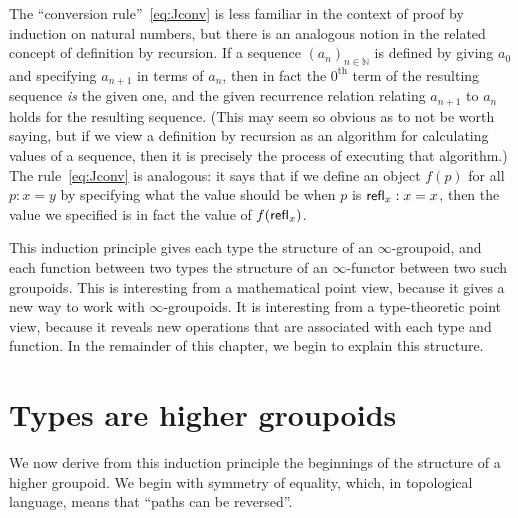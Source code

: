 The ``conversion rule''~\eqref{eq:Jconv} is less familiar in the context of proof by induction on natural numbers, but there is an analogous notion in the related concept of definition by recursion.
If a sequence $(a_n)_{n\in \mathbb{N}}$ is defined by giving $a_0$ and specifying $a_{n+1}$ in terms of $a_n$, then in fact the $0^{\mathrm{th}}$ term of the resulting sequence \emph{is} the given one, and the given recurrence relation relating $a_{n+1}$ to $a_n$ holds for the resulting sequence.
(This may seem so obvious as to not be worth saying, but if we view a definition by recursion as an algorithm for calculating values of a sequence, then it is precisely the process of executing that algorithm.)
The rule~\eqref{eq:Jconv} is analogous: it says that if we define an object $f(p)$ for all $p:x=y$ by specifying what the value should be when $p$ is $\mathsf{refl}_{x}:x=x$, then the value we specified is in fact the value of $f(\mathsf{refl}_{x})$.

This induction principle gives each type the structure of an $\infty$-groupoid, and each function between two types the structure of an $\infty$-functor between two such groupoids.  This is interesting from a mathematical point view, because it gives a new way to work with
$\infty$-groupoids.  It is interesting from a type-theoretic point view, because it reveals new operations that are associated with each type and function.  In the remainder of this chapter, we begin to explain this structure.

\section{Types are higher groupoids}
\label{sec:equality}

We now derive from this induction principle the beginnings of the structure of a higher groupoid.
We begin with symmetry of equality, which, in topological language, means that ``paths can be reversed''.

